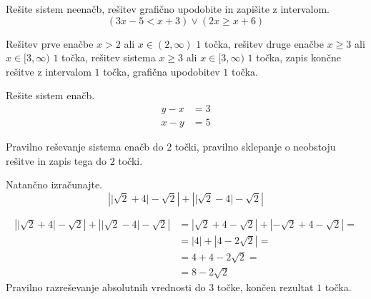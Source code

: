 \documentclass[addpoints]{exam}
\begin{document}
\begin{questions}
        

    \newpage
    \question[5]
    Rešite sistem neenačb, rešitev grafično upodobite in zapišite z intervalom.
    $$ \left(3x-5<x+3\right)\lor\left(2x\geq x+6\right) $$
    
    
    \begin{solution}[12cm]
        Rešitev prve enačbe $x>2$ ali $x\in(2,\infty)$ $1$ točka, rešitev druge enačbe $x\geq 3$ ali $x\in[3,\infty)$ $1$ točka, rešitev sistema $x\geq 3$ ali $x\in[3,\infty)$ $1$ točka, zapis končne rešitve z intervalom $1$ točka, grafična upodobitev $1$ točka.
    \end{solution}


    


    \question[4]
    Rešite sistem enačb.
    $$ \begin{aligned}
        y-x&=3 \\ x-y&=5
    \end{aligned} $$
    
    
    \begin{solution}[7cm]
        Pravilno reševanje sistema enačb do $2$ točki, pravilno sklepanje o neobstoju rešitve in zapis tega do $2$ točki.
    \end{solution}



    
    




    \newpage 

    
    \question[4]
    Natančno izračunajte.
    $$ \left\lvert \lvert\sqrt{2}+4\rvert-\sqrt{2}\right\rvert + \left\lvert \lvert\sqrt{2}-4\rvert-\sqrt{2}\right\rvert $$
    
    
    
    \begin{solution}[11cm]
        \begin{align*}
            \left\lvert \lvert\sqrt{2}+4\rvert-\sqrt{2}\right\rvert + \left\lvert \lvert\sqrt{2}-4\rvert-\sqrt{2}\right\rvert &=
            \left\lvert \sqrt{2}+4-\sqrt{2}\right\rvert + \left\lvert -\sqrt{2}+4-\sqrt{2}\right\rvert= \\
            &= \left\lvert 4\right\rvert + \left\lvert 4-2\sqrt{2}\right\rvert= \\
            &= 4+4-2\sqrt{2}= \\
            &= 8-2\sqrt{2}
        \end{align*}
        Pravilno razreševanje absolutnih vrednosti do $3$ točke, končen rezultat $1$ točka.
    \end{solution}





\end{questions}
\end{document}
